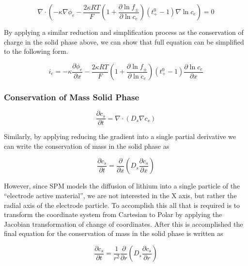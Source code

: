 \documentclass[lettersize,journal]{IEEEtran}
\begin{document}
\begin{equation}\label{COC_e}
\nabla \cdot\left(-\kappa \nabla \phi_{e}-\frac{2 \kappa R T}{F}\left(1+\frac{\partial \ln f_{\pm}}{\partial \ln c_{e}}\right)\left(t_{+}^{0}-1\right) \nabla \ln c_{e}\right)=0
\end{equation}

By applying a similar reduction and simplification process as the conservation of charge in the solid phase above, we can show that full equation can be simplified to the following form.

\begin{equation}
i_e = -\kappa \frac{\partial{\phi_{e}}}{\partial{x}} -\frac{2 \kappa R T}{F}\left(1+\frac{\partial \ln f_{\pm}}{\partial \ln c_{e}}\right)\left(t_{+}^{0}-1\right) \frac{\partial{\ln c_{e}}}{\partial{x}}
\end{equation}

\subsubsection{Conservation of Mass Solid Phase}

\begin{equation}
\frac{\partial c_{s}}{\partial t}=\nabla \cdot\left(D_{s} \nabla c_{s}\right)
\end{equation}

Similarly, by applying reducing the gradient into a single partial derivative we can write the conservation of mass in the solid phase as

\begin{equation}
\frac{\partial c_{s}}{\partial t}=  \frac{\partial}{\partial{x}} \left( D_s \frac{\partial{c_s}}{\partial{x}} \right)
\end{equation}

However, since SPM models the diffusion of lithium into a single particle of the ``electrode active material'', we are not interested in the X axis, but rather the radial axis of the electrode particle. To accomplish this all that is required is to transform the coordinate system from Cartesian to Polar by applying the Jacobian transformation of change of coordinates. After this is accomplished the final equation for the conservation of mass in the solid phase is written as

\begin{equation}
\frac{\partial c_{s}}{\partial t}= \frac{1}{r^2} \frac{\partial}{\partial{r}} \left( D_s \frac{\partial{c_s}}{\partial{r}} \right)
\end{equation}
\end{document}
